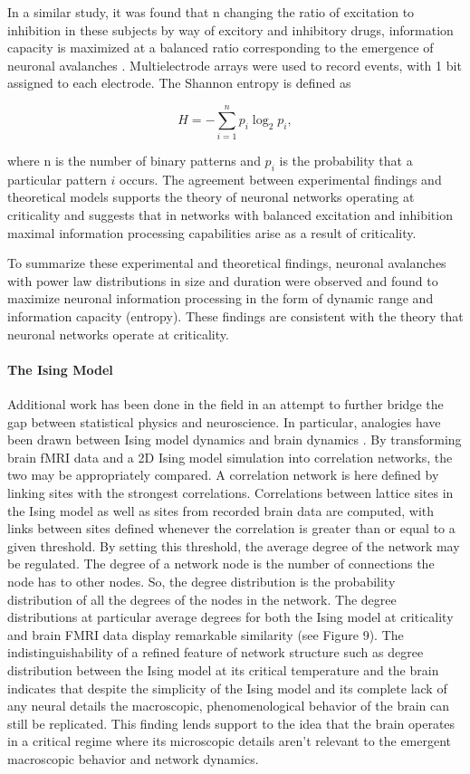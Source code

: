 \documentclass[12pt]{article}
\begin{document}
In a similar study, it was found that n changing the ratio of excitation to inhibition in these subjects by way of excitory and inhibitory drugs, information capacity is maximized at a balanced ratio corresponding to the emergence of neuronal avalanches \cite{Shew2011a}. Multielectrode arrays were used to record events, with 1 bit assigned to each electrode. The Shannon entropy is defined as

\begin{equation}
H = - \sum^{n}_{i=1}p_{i}\log_{2}p_{i},
\end{equation}

\noindent where n is the number of binary patterns and $ p_{i} $ is the probability that a particular pattern $i$ occurs. The agreement between experimental findings and theoretical models supports the theory of neuronal networks operating at criticality and suggests that in networks with balanced excitation and inhibition maximal information processing capabilities arise as a result of criticality. 

To summarize these experimental and theoretical findings, neuronal avalanches with power law distributions in size and duration were observed and found to maximize neuronal information processing in the form of dynamic range and information capacity (entropy). These findings are consistent with the theory that neuronal networks operate at criticality. 

\paragraph{The Ising Model}
Additional work has been done in the field in an attempt to further bridge the gap between statistical physics and neuroscience. In particular, analogies have been drawn between Ising model dynamics and brain dynamics \cite{Fraiman2009a}. By transforming brain fMRI data and a 2D Ising model simulation into correlation networks, the two may be appropriately compared. A correlation network is here defined by linking sites with the strongest correlations. Correlations between lattice sites in the Ising model as well as sites from recorded brain data are computed, with links between sites defined whenever the correlation is greater than or equal to a given threshold. By setting this threshold, the average degree of the network may be regulated. The degree of a network node is the number of connections the node has to other nodes. So, the degree distribution is the probability distribution of all the degrees of the nodes in the network. The degree distributions at particular average degrees for both the Ising model at criticality and brain FMRI data display remarkable similarity (see Figure 9). The indistinguishability of a refined feature of network structure such as degree distribution between the Ising model at its critical temperature and the brain indicates that despite the simplicity of the Ising model and its complete lack of any neural details the macroscopic, phenomenological behavior of the brain can still be replicated. This finding lends support to the idea that the brain operates in a critical regime where its microscopic details aren't relevant to the emergent macroscopic behavior and network dynamics.
\end{document}
